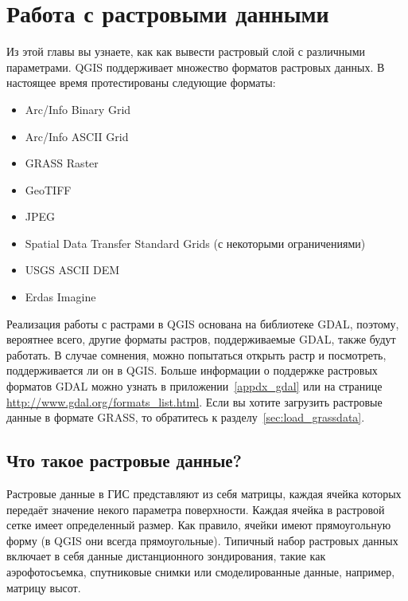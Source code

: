 \chapter{Работа с растровыми данными}\label{label_raster}


Из этой главы вы узнаете, как как вывести растровый слой с различными параметрами.
QGIS поддерживает множество форматов растровых данных. В настоящее время
протестированы следующие форматы:

\begin{itemize}[label=--]
\item Arc/Info Binary Grid
\item Arc/Info ASCII Grid
\item GRASS Raster
\item GeoTIFF
\item JPEG
\item Spatial Data Transfer Standard Grids (с некоторыми ограничениями)
\item USGS ASCII DEM
\item Erdas Imagine
\end{itemize}

Реализация работы с растрами в QGIS основана на библиотеке GDAL, поэтому,
вероятнее всего, другие форматы растров, поддерживаемые GDAL, также будут работать.
В случае сомнения, можно попытаться открыть растр и посмотреть,
поддерживается ли он в QGIS. Больше информации о поддержке растровых
форматов GDAL можно узнать в приложении~\ref{appdx_gdal}
или на странице \url{http://www.gdal.org/formats_list.html}. Если вы хотите
загрузить растровые данные в формате GRASS, то обратитесь к
разделу~\ref{sec:load_grassdata}.

\section{Что такое растровые данные?}\label{label_whatsraster}

Растровые данные в ГИС представляют из себя матрицы, каждая ячейка которых
передаёт значение некого параметра поверхности. Каждая ячейка в
растровой сетке имеет определенный размер. Как правило, ячейки имеют
прямоугольную форму (в QGIS они всегда прямоугольные). Типичный набор
растровых данных включает в себя данные дистанционного зондирования,
такие как аэрофотосъемка, спутниковые снимки или смоделированные данные,
например, матрицу высот.

